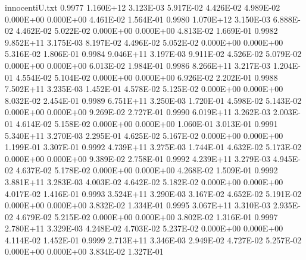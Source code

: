 \begin{filecontents}{innocentiU.txt}
0.9977 1.160E+12 3.123E-03 5.917E-02 4.426E-02 4.989E-02 0.000E+00 0.000E+00 4.461E-02 1.564E-01
0.9980 1.070E+12 3.150E-03 6.888E-02 4.462E-02 5.022E-02 0.000E+00 0.000E+00 4.813E-02 1.669E-01
0.9982 9.852E+11 3.175E-03 8.197E-02 4.496E-02 5.052E-02 0.000E+00 0.000E+00 5.316E-02 1.806E-01
0.9984 9.046E+11 3.197E-03 9.911E-02 4.526E-02 5.079E-02 0.000E+00 0.000E+00 6.013E-02 1.984E-01
0.9986 8.266E+11 3.217E-03 1.204E-01 4.554E-02 5.104E-02 0.000E+00 0.000E+00 6.926E-02 2.202E-01
0.9988 7.502E+11 3.235E-03 1.452E-01 4.578E-02 5.125E-02 0.000E+00 0.000E+00 8.032E-02 2.454E-01
0.9989 6.751E+11 3.250E-03 1.720E-01 4.598E-02 5.143E-02 0.000E+00 0.000E+00 9.269E-02 2.727E-01
0.9990 6.019E+11 3.262E-03 2.003E-01 4.614E-02 5.158E-02 0.000E+00 0.000E+00 1.060E-01 3.013E-01
0.9991 5.340E+11 3.270E-03 2.295E-01 4.625E-02 5.167E-02 0.000E+00 0.000E+00 1.199E-01 3.307E-01
0.9992 4.739E+11 3.275E-03 1.744E-01 4.632E-02 5.173E-02 0.000E+00 0.000E+00 9.389E-02 2.758E-01
0.9992 4.239E+11 3.279E-03 4.945E-02 4.637E-02 5.178E-02 0.000E+00 0.000E+00 4.268E-02 1.509E-01
0.9992 3.881E+11 3.283E-03 4.003E-02 4.642E-02 5.182E-02 0.000E+00 0.000E+00 4.017E-02 1.416E-01
0.9993 3.524E+11 3.290E-03 3.167E-02 4.652E-02 5.191E-02 0.000E+00 0.000E+00 3.832E-02 1.334E-01
0.9995 3.067E+11 3.310E-03 2.935E-02 4.679E-02 5.215E-02 0.000E+00 0.000E+00 3.802E-02 1.316E-01
0.9997 2.780E+11 3.329E-03 4.248E-02 4.703E-02 5.237E-02 0.000E+00 0.000E+00 4.114E-02 1.452E-01
0.9999 2.713E+11 3.346E-03 2.949E-02 4.727E-02 5.257E-02 0.000E+00 0.000E+00 3.834E-02 1.327E-01
\end{filecontents}
